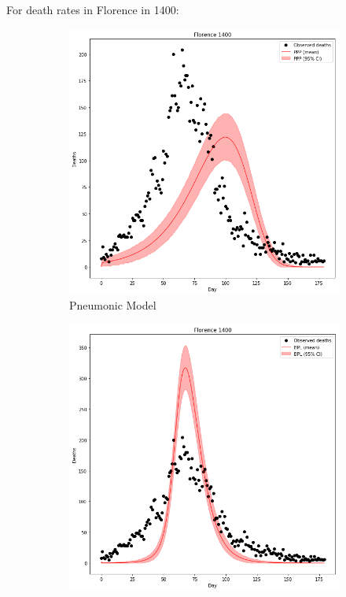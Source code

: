 \documentclass [letterpaper, 12pt] {article}
\begin{document}
\newpage
For death rates in Florence in 1400:

\begin{figure}[H]
	\begin{subfigure}{0.48\textwidth}
	\includegraphics[width=\linewidth]{pneum_florence.png}
	\caption{Pneumonic Model}
	\end{subfigure}\hspace{\fill}
	\begin{subfigure}{0.48\textwidth}
	\includegraphics[width=\linewidth]{rats1_florence.png}

\end{subfigure}
\end{figure}
\end{document}
